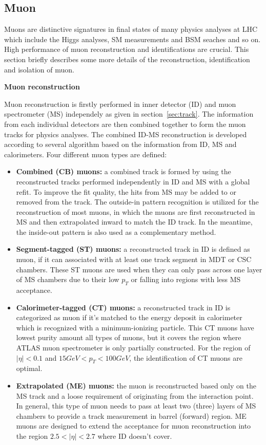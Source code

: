 \subsection{Muon}

Muons are distinctive signatures in final states of many physics analyses at LHC which include the Higgs analyses, SM measurements and BSM seaches and so on. 
High performance of muon reconstruction and identifications are crucial.
This section briefly describes some more details of the reconstruction, identification and isolation of muon.

\textbf{Muon reconstruction}

Muon reconstruction is firstly performed in inner detector (ID) and muon spectrometer (MS) independely as given in section~\ref{sec:track}.
The information from each individual detectors are then combined together to form the muon tracks for physics analyses.
The combined ID-MS reconstruction is developed according to several algorithm based on the information from ID, MS and calorimeters.
Four different muon types are defined\cite{Aad:2016jkr}:
\begin{itemize}
	\item \textbf{Combined (CB) muons:} a combined track is formed by using the reconstructed tracks performed independently in ID and MS with a global refit. To improve the fit quality, the hits from MS may be added to or removed from the track. The outside-in pattern recognition is utilized for the reconstruction of most muons, in which the muons are first reconstructed in MS and then extrapolated inward to match the ID track. In the meantime, the inside-out pattern is also used as a complementary method.
	\item \textbf{Segment-tagged (ST) muons:} a reconstructed track in ID is defined as muon, if it can associated with at least one track segment in MDT or CSC chambers. These ST muons are used when they can only pass across one layer of MS chambers due to their low $p_{T}$ or falling into regions with less MS acceptance.
	\item \textbf{Calorimeter-tagged (CT) muons:} a reconstructed track in ID is categorized as muon if it's matched to the energy deposit in calorimeter which is recognized with a minimum-ionizing particle. This CT muons have lowest purity amount all types of muons, but it covers the region where ATLAS muon spectrometer is only partially constructed. For the region of $|\eta| < 0.1$ and $15 GeV < p_{T} < 100 GeV$, the identification of CT muons are optimal.
	\item \textbf{Extrapolated (ME) muons:} the muon is reconstructed based only on the MS track and a loose requirement of originating from the interaction point. In general, this type of muon needs to pass at least two (three) layers of MS chambers to provide a track measurement in barrel (forward) region. ME muons are designed to extend the acceptance for muon reconstruction into the region $2.5 < |\eta| < 2.7$ where ID doesn't cover.
\end{itemize}


